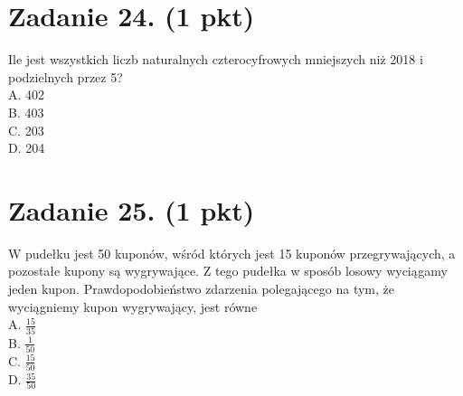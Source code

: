 \documentclass[10pt]{article}
\begin{document}
\section*{Zadanie 24. (1 pkt)}
Ile jest wszystkich liczb naturalnych czterocyfrowych mniejszych niż 2018 i podzielnych przez 5?\\
A. 402\\
B. 403\\
C. 203\\
D. 204

\section*{Zadanie 25. (1 pkt)}
W pudełku jest 50 kuponów, wśród których jest 15 kuponów przegrywających, a pozostałe kupony są wygrywające. Z tego pudełka w sposób losowy wyciągamy jeden kupon. Prawdopodobieństwo zdarzenia polegającego na tym, że wyciągniemy kupon wygrywający, jest równe\\
A. \(\frac{15}{35}\)\\
B. \(\frac{1}{50}\)\\
C. \(\frac{15}{50}\)\\
D. \(\frac{35}{50}\)
\end{document}
